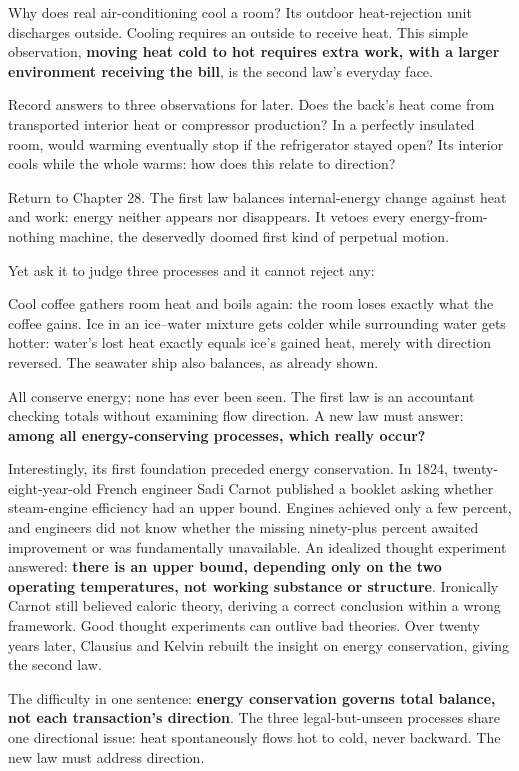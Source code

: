 Why does real air-conditioning cool a room? Its outdoor heat-rejection unit discharges outside. Cooling requires an outside to receive heat. This simple observation, \textbf{moving heat cold to hot requires extra work, with a larger environment receiving the bill}, is the second law's everyday face.

Record answers to three observations for later. Does the back's heat come from transported interior heat or compressor production? In a perfectly insulated room, would warming eventually stop if the refrigerator stayed open? Its interior cools while the whole warms: how does this relate to direction?


Return to Chapter 28. The first law balances internal-energy change against heat and work: energy neither appears nor disappears. It vetoes every energy-from-nothing machine, the deservedly doomed first kind of perpetual motion.

Yet ask it to judge three processes and it cannot reject any:

Cool coffee gathers room heat and boils again: the room loses exactly what the coffee gains. Ice in an ice--water mixture gets colder while surrounding water gets hotter: water's lost heat exactly equals ice's gained heat, merely with direction reversed. The seawater ship also balances, as already shown.

All conserve energy; none has ever been seen. The first law is an accountant checking totals without examining flow direction. A new law must answer: \textbf{among all energy-conserving processes, which really occur?}

Interestingly, its first foundation preceded energy conservation. In 1824, twenty-eight-year-old French engineer Sadi Carnot published a booklet asking whether steam-engine efficiency had an upper bound. Engines achieved only a few percent, and engineers did not know whether the missing ninety-plus percent awaited improvement or was fundamentally unavailable. An idealized thought experiment answered: \textbf{there is an upper bound, depending only on the two operating temperatures, not working substance or structure}. Ironically Carnot still believed caloric theory, deriving a correct conclusion within a wrong framework. Good thought experiments can outlive bad theories. Over twenty years later, Clausius and Kelvin rebuilt the insight on energy conservation, giving the second law.

\begin{mainline}
The difficulty in one sentence: \textbf{energy conservation governs total balance, not each transaction's direction}. The three legal-but-unseen processes share one directional issue: heat spontaneously flows hot to cold, never backward. The new law must address direction.
\end{mainline}

